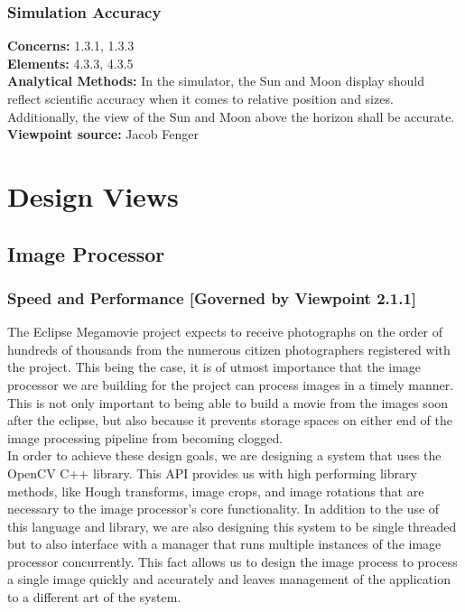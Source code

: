 \documentclass[10pt, onecolumn, draftclsnofoot, letterpaper, compsoc]{IEEEtran}
\begin{document}
  \subsubsection{Simulation Accuracy}
  \textbf{Concerns:} 1.3.1, 1.3.3 \\
  \textbf{Elements:} 4.3.3, 4.3.5 \\
  \textbf{Analytical Methods:} In the simulator, the Sun and
  Moon display should reflect scientific accuracy when it
  comes to relative position and sizes. Additionally, the
  view of the Sun and Moon above the horizon shall be
  accurate.\\
  \textbf{Viewpoint source:} Jacob Fenger \\


\section{Design Views}

\subsection{Image Processor}

\subsubsection{Speed and Performance [Governed by Viewpoint 2.1.1]}

The Eclipse Megamovie project expects to receive photographs on the order of
hundreds of thousands from the numerous citizen photographers registered with
the project. This being the case, it is of utmost importance that the image
processor we are building for the project can process images in a timely manner.
This is not only important to being able to build a movie from the images soon
after the eclipse, but also because it prevents storage spaces on either end of
the image processing pipeline from becoming clogged. \\

In order to achieve these design goals, we are designing a system that uses the
OpenCV C++ library.  This API provides us with high performing library methods,
like Hough transforms, image crops, and image rotations that are necessary to
the image processor's core functionality. In addition to the use of this
language and library, we are also designing this system to be single threaded
but to also interface with a manager that runs multiple instances of the image
processor concurrently. This fact allows us to design the image process to
process a single image quickly and accurately and leaves management of the
application to a different art of the system.\\
\end{document}
